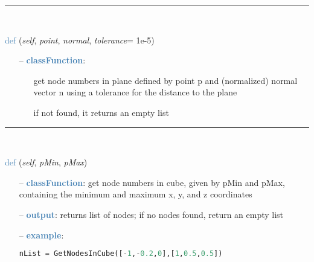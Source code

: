 \begin{itemize}[leftmargin=1.4cm]
\begin{itemize}[leftmargin=0.5cm]
\begin{itemize}[leftmargin=1.4cm]
\begin{itemize}[leftmargin=1.4cm]
\begin{itemize}[leftmargin=0.5cm]
%
\noindent\rule{8cm}{0.75pt}\vspace{1pt} \\ 
\begin{flushleft}
\noindent \textcolor{steelblue}{def {\bf {}}}\label{sec:FEM:FEMinterface:GetNodesInPlane}
({\it self}, {\it point}, {\it normal}, {\it tolerance}= 1e-5)
\end{flushleft}
\setlength{\itemindent}{0.7cm}
\begin{itemize}[leftmargin=0.7cm]
  \item[--]  \textcolor{steelblue}{\bf classFunction}: \vspace{-6pt}
  \begin{itemize}[leftmargin=1.2cm]
\setlength{\itemindent}{-0.7cm}
    \item[] get node numbers in plane defined by point p and (normalized) normal vector n using a tolerance for the distance to the plane
    \item[] if not found, it returns an empty list
  \end{itemize}
\vspace{12pt}\end{itemize}
%
\noindent\rule{8cm}{0.75pt}\vspace{1pt} \\ 
\begin{flushleft}
\noindent \textcolor{steelblue}{def {\bf {}}}\label{sec:FEM:FEMinterface:GetNodesInCube}
({\it self}, {\it pMin}, {\it pMax})
\end{flushleft}
\setlength{\itemindent}{0.7cm}
\begin{itemize}[leftmargin=0.7cm]
  \item[--]  \textcolor{steelblue}{\bf classFunction}: get node numbers in cube, given by pMin and pMax, containing the minimum and maximum x, y, and z coordinates  \item[--]  \textcolor{steelblue}{\bf output}: returns list of nodes; if no nodes found, return an empty list  \item[--]  \textcolor{steelblue}{\bf example}: \vspace{-12pt}\ei\begin{lstlisting}[language=Python, xleftmargin=36pt]
nList = GetNodesInCube([-1,-0.2,0],[1,0.5,0.5])\end{lstlisting}\vspace{-24pt}\bi\item[]\vspace{-24pt}\vspace{12pt}\end{itemize}

\end{itemize}
\end{itemize}
\end{itemize}
\end{itemize}
\end{itemize}
